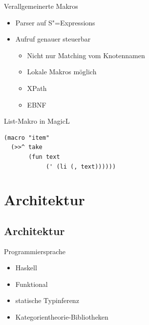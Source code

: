 \documentclass{beamer}
\newcommand{\sexps}{S"=Expressions}
\begin{document}
\begin{frame}[fragile]{Verallgemeinerte Makros}
  \begin{itemize}
  \item Parser auf \sexps{}
  \item Aufruf genauer steuerbar
    \begin{itemize}
    \item Nicht nur Matching vom Knotennamen
    \item Lokale Makros möglich
    \item XPath
    \item EBNF
    \end{itemize}
  \end{itemize}
  \begin{block}{List-Makro in MagicL}
\begin{verbatim}
(macro "item"
  (>>^ take
       (fun text 
            (' (li (, text))))))  
\end{verbatim}
  \end{block}
\end{frame}

\section{Architektur}
\subsection{Architektur}

\begin{frame}{Programmiersprache}
  \begin{itemize}
  \item Haskell
  \item Funktional
  \item statische Typinferenz
  \item Kategorientheorie-Bibliotheken
  \end{itemize}
\end{frame}
\end{document}
